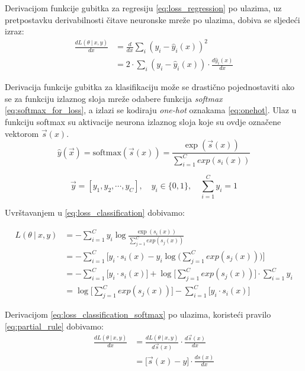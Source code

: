 \documentclass[times, utf8, numeric, diplomski]{fer}
\def\dfrac#1#2{\frac{d #1}{d #2}}
\def\probsep{\ |\ }
\begin{document}
Derivacijom funkcije gubitka za regresiju \eqref{eq:loss_regression} po ulazima, uz pretpostavku derivabilnosti čitave neuronske mreže po ulazima, dobiva se sljedeći izraz:
\begin{align}
\dfrac{L(\theta \probsep x,y)}{x} &= \dfrac{}{x}\sum_i(y_i - \hat{y}_i(x))^2 \nonumber \\
&= 2 \cdot \sum_i (y_i - \hat{y}_i(x)) \cdot \dfrac{\hat{y}_i(x)}{x}
\end{align}

Derivacija funkcije gubitka za klasifikaciju može se drastično pojednostaviti ako se za funkciju izlaznog sloja mreže odabere funkcija \textit{softmax} \eqref{eq:softmax_for_loss}, a izlazi se kodiraju \textit{one-hot} oznakama \eqref{eq:onehot}. Ulaz u funkciju softmax su aktivacije neurona izlaznog sloja koje su ovdje označene vektorom $\vec{s}(x)$.
\begin{equation}
\label{eq:softmax_for_loss}
\hat{y}(\vec{x}) = \text{softmax}(\vec{s}(x)) = \frac{\exp(\vec{s}(x))}{\sum_{i=1}^{C} exp(s_i(x))}
\end{equation}

\begin{equation}
\label{eq:onehot}
\vec{y}=[y_1, y_2, \cdots, y_C], \quad y_i \in \{0,1\}, \quad \sum_{i=1}^C y_i = 1
\end{equation}

Uvrštavanjem u \eqref{eq:loss_classification} dobivamo:

\begin{align}
\label{eq:loss_classification_softmax}
L(\theta \probsep x,y) &= - \sum_{i=1}^C y_i \log \frac{\exp(s_i(x))}{\sum_{j=1}^{C} exp(s_j(x))} \nonumber \\
&= - \sum_{i=1}^C \bigg[ y_i \cdot s_i(x) - y_i \log\big(\sum_{j=1}^{C} exp(s_j(x))\big) \bigg] \nonumber \\
&= - \sum_{i=1}^C \big[ y_i \cdot s_i(x) \big] + \log\big[\sum_{j=1}^{C} exp(s_j(x))\big] \cdot \sum_{i=1}^C y_i \nonumber \\
&= \log\big[\sum_{j=1}^{C} exp(s_j(x))\big] - \sum_{i=1}^C \big[ y_i \cdot s_i(x) \big]
\end{align}

Derivacijom \eqref{eq:loss_classification_softmax} po ulazima, koristeći pravilo \eqref{eq:partial_rule} dobivamo:
\begin{align}
\dfrac{L(\theta \probsep x,y)}{x} &= \dfrac{L(\theta \probsep x,y)}{\vec{s}(x)} \cdot \dfrac{\vec{s}(x)}{x} \nonumber \\
&= \bigg[ \vec{s}(x) - y \bigg] \cdot \dfrac{s(x)}{x}
\end{align}
\end{document}
